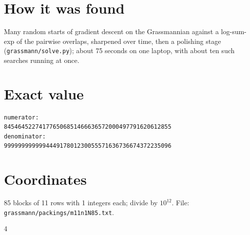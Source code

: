 \documentclass[11pt,a4paper]{article}
\begin{document}
\section{How it was found}
Many random starts of gradient descent on the Grassmannian against a log-sum-exp of the pairwise overlaps, sharpened over time, then a polishing stage (\texttt{grassmann/solve.py}); about 75 seconds on one laptop, with about ten such searches running at once.


\appendix
\section{Exact value}
{\small
\begin{verbatim}
numerator:
845464522741776506851466636572000497791620612855
denominator:
999999999999444917801230055571636736674372235096
\end{verbatim}}

\section{Coordinates}
85 blocks of 11 rows with 1 integers each; divide by $10^{12}$. File: \texttt{grassmann/packings/m11n1N85.txt}.
{\tiny
\begin{multicols}{4}
\end{multicols}}
\end{document}
